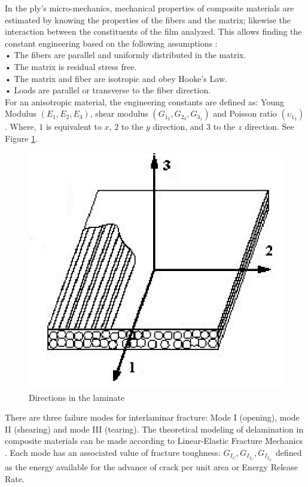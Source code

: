 In the ply's micro-mechanics, mechanical properties of composite materials are estimated by knowing the properties of the fibers and the matrix; likewise the interaction between the constituents of the film analyzed.
This allows finding the constant engineering based on the following assumptions \cite{mat}:\\
• The fibers are parallel and uniformly distributed in the matrix.\\
• The matrix is residual stress free.\\
• The matrix and fiber are isotropic and obey Hooke's Law.\\
• Loads are parallel or transverse to the fiber direction.\\

For an anisotropic material, the engineering constants are defined as: Young Modulus $(E_1,E_2,E_3)$, shear modulus $(G_1_2,G_2_3,G_3_1)$ and Poisson ratio $(\upsilon_1_2)$. Where, $1$ is equivalent to $x$, $2$ to the $y$ direction, and $3$ to the $z$ direction. See Figure \ref{fig:1}. %
\begin{figure}[H]
\includegraphics{Direcciones}
\caption{ Directions in the laminate \cite{imagen}}
\label{fig:1}       %
\end{figure}
There are three failure modes for interlaminar fracture: Mode I (opening), mode II (shearing) and mode III (tearing). The theoretical modeling of delamination in composite materials can be made according to Linear-Elastic Fracture Mechanics . Each mode has an associated value of fracture toughness: $G_I_C, G_I_I_C, G_I_I_I_C$ defined as the energy available for the advance of crack per unit area or Energy Release Rate.\\

